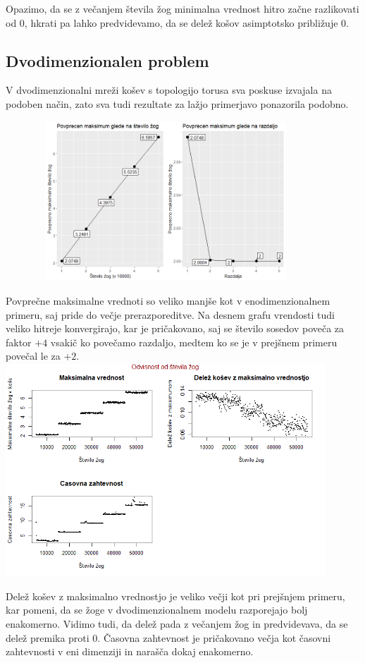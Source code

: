 \documentclass[a4paper, 11pt]{article}
\begin{document}
Opazimo, da se z večanjem števila žog minimalna vrednost hitro začne razlikovati od 0, hkrati pa lahko predvidevamo, da se delež košov asimptotsko približuje $0$. 
\bigbreak

\subsection{Dvodimenzionalen problem}
V dvodimenzionalni mreži košev s topologijo torusa sva poskuse izvajala na podoben način, zato sva tudi rezultate za lažjo primerjavo ponazorila podobno.

\includegraphics[width=12cm, height=6cm]{povprecje_2dim1.png}

Povprečne maksimalne vrednoti so veliko manjše kot v enodimenzionalnem primeru, saj pride do večje prerazporeditve. Na desnem grafu vrendosti tudi veliko hitreje konvergirajo, kar je pričakovano, saj se število sosedov poveča za faktor $+4$ vsakič ko povečamo razdaljo, 
medtem ko se je v prejšnem primeru povečal le za $+2$.
\bigbreak
\includegraphics[width=12cm, height= 8cm]{dim2_glede_na_stevilo_zog1.png}

Delež košev z maksimalno vrednostjo je veliko večji kot pri prejšnjem primeru, kar pomeni, 
da se žoge v dvodimenzionalnem modelu razporejajo bolj enakomerno. Vidimo tudi, da 
delež pada z večanjem žog in predvidevava, da se delež premika proti $0$. Časovna zahtevnost je pričakovano večja kot časovni zahtevnosti v eni dimenziji in narašča dokaj enakomerno.
\end{document}
